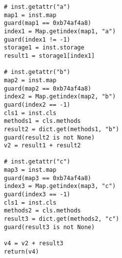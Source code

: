 \begin{Verbatim}
# inst.getattr("a")
map1 = inst.map
guard(map1 == 0xb74af4a8)
index1 = Map.getindex(map1, "a")
guard(index1 != -1)
storage1 = inst.storage
result1 = storage1[index1]

# inst.getattr("b")
map2 = inst.map
guard(map2 == 0xb74af4a8)
index2 = Map.getindex(map2, "b")
guard(index2 == -1)
cls1 = inst.cls
methods1 = cls.methods
result2 = dict.get(methods1, "b")
guard(result2 is not None)
v2 = result1 + result2

# inst.getattr("c")
map3 = inst.map
guard(map3 == 0xb74af4a8)
index3 = Map.getindex(map3, "c")
guard(index3 == -1)
cls1 = inst.cls
methods2 = cls.methods
result3 = dict.get(methods2, "c")
guard(result3 is not None)

v4 = v2 + result3
return(v4)
\end{Verbatim}
